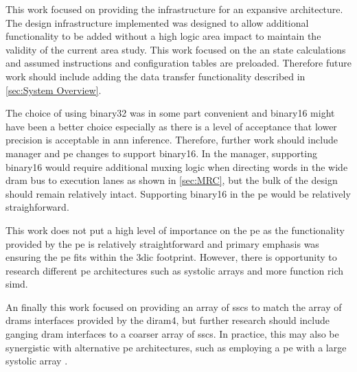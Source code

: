 This work focused on providing the infrastructure for an expansive architecture.
The design infrastructure implemented was designed to allow additional functionality to be added without a high logic area impact to maintain the validity of the current area study.
This work focused on the \ac{an} state calculations and assumed instructions and configuration tables are preloaded.
Therefore future work should include adding the data transfer functionality described in \ref{sec:System Overview}.

The choice of using \ac{binary32} was in some part convenient and \ac{binary16} might have been a better choice especially as there is a level of acceptance that lower precision is acceptable in \ac{ann} inference.
Therefore, further work should include manager and \ac{pe} changes to support \ac{binary16}.
In the manager, supporting \ac{binary16} would require additional muxing logic when directing words in the wide \ac{dram} bus to execution lanes as shown in \ref{sec:MRC}, but the bulk of the design should remain relatively intact.
Supporting \ac{binary16} in the \ac{pe} would be relatively straighforward.

This work does not put a high level of importance on the \ac{pe} as the functionality provided by the \ac{pe} is relatively straightforward and primary emphasis was ensuring the \ac{pe} fits within the \ac{3dic} footprint.
However, there is opportunity to research different \ac{pe} architectures such as systolic arrays and more function rich \ac{simd}.

An finally this work focused on providing an array of \acp{ssc} to match the array of \acp{dram} interfaces provided by the \ac{diram4}, but further research should include ganging \ac{dram} interfaces to a coarser array of \acp{ssc}.
In practice, this may also be synergistic with alternative \ac{pe} architectures, such as employing a \ac{pe} with a large systolic array \cite{tensorflow2015-whitepaper}.

\iffalse
  \item Half-Precision PE
  \item Additional PE pipelining
  \item Systolic PE
\fi

